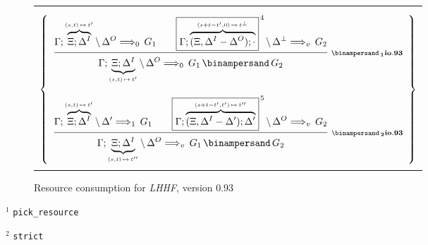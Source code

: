 \begin{figure}[t]
\begin{center}
\begin{tabular}{|c|}
      \\ \\ \\
      $\left\{
        \begin{array}{c}
          \ruleII
            {\ioIXd
              {\G;\ob{\X;\D^I}{s,t}{t'}}
              {\D^O}{G_1}{0}}
            {\ioIXd
              {\fb{\G;\ob{(\X,\D^I-\D^O);\cdot}{s+t-t',0}{t^\Bot}}{4}}
              {\D^\Bot}{G_2}{v}}
            {\ioIXd
              {\G;\ub{\X;\D^I}{s,t}{t'}}
              {\D^O}{G_1 \With G_2}{0}}
            {\With_1 io.93}
        \\ \\
          \ruleII
          {\ioIXd
            {\G;\ob{\X;\D^I}{s,t}{t'}}
            {\D'} {G_1}{1}}
          {\ioIXd
            {\fb{\G;\ob{(\X,\D^I-\D');\D'}{s+t-t',t'}{t''}}{5}}
            {\D^O}{G_2}{v}}
          {\ioIXd
            {\G;\ub{\X;\D^I}{s,t}{t''}}
            {\D^O}{G_1 \With G_2}{v}}
          {\With_2 io.93}
      \end{array}
    \right\}$
    \\ \\
    \hline
  \end{tabular}

    \caption{Resource consumption for {\em LHHF}, version 0.93}
    \label{fig:RC_IXd1}
  \end{center}
\end{figure}

\bigskip
$^1$ {\tt pick\_resource}

$^2$ {\tt strict}




